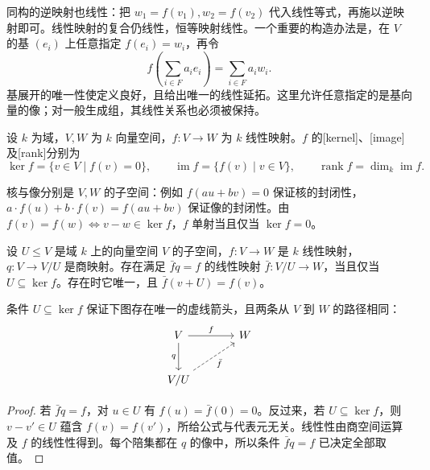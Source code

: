 同构的逆映射也线性：把 \(w_1=f(v_1),w_2=f(v_2)\) 代入线性等式，再施以逆映射即可。线性映射的复合仍线性，恒等映射线性。一个重要的构造办法是，在 \(V\) 的基 \((e_i)\) 上任意指定 \(f(e_i)=w_i\)，再令
\[
	f\left(\sum_{i\in F}a_ie_i\right)=\sum_{i\in F}a_iw_i.
\]
基展开的唯一性使定义良好，且给出唯一的线性延拓。这里允许任意指定的是基向量的像；对一般生成组，其线性关系也必须被保持。

\begin{definition}\label{b2:def:kernel-image-rank}
	设 \(k\) 为域，\(V,W\) 为 \(k\) 向量空间，\(f:V\to W\) 为 \(k\) 线性映射。\(f\) 的[kernel]、[image]及[rank]分别为
	\[
		\ker f=\{v\in V\mid f(v)=0\},\qquad \operatorname{im}f=\{f(v)\mid v\in V\},\qquad \operatorname{rank}f=\dim_k\operatorname{im}f.
	\]
\end{definition}

核与像分别是 \(V,W\) 的子空间：例如 \(f(au+bv)=0\) 保证核的封闭性，\(a\cdot f(u)+b\cdot f(v)=f(au+bv)\) 保证像的封闭性。由 \(f(v)=f(w)\iff v-w\in\ker f\)，\(f\) 单射当且仅当 \(\ker f=0\)。

\begin{proposition}[商空间的映射性质]\label{b2:prop:quotient-linear-universal}
	设 \(U\le V\) 是域 \(k\) 上的向量空间 \(V\) 的子空间，\(f:V\to W\) 是 \(k\) 线性映射，\(q:V\to V/U\) 是商映射。存在满足 \(\bar f q=f\) 的线性映射 \(\bar f:V/U\to W\)，当且仅当 \(U\subseteq\ker f\)。存在时它唯一，且 \(\bar f(v+U)=f(v)\)。

	条件 \(U\subseteq\ker f\) 保证下图存在唯一的虚线箭头，且两条从 \(V\) 到 \(W\) 的路径相同：
	\[
		\begin{tikzcd}[column sep=3.5em,row sep=2.5em]
			V\arrow[r,"f"]\arrow[d,"q"']&W\\
			V/U\arrow[ur,dashed,"\bar f"']&
		\end{tikzcd}
	\]
\end{proposition}
\begin{proof}
	若 \(\bar f q=f\)，对 \(u\in U\) 有 \(f(u)=\bar f(0)=0\)。反过来，若 \(U\subseteq\ker f\)，则 \(v-v'\in U\) 蕴含 \(f(v)=f(v')\)，所给公式与代表元无关。线性性由商空间运算及 \(f\) 的线性性得到。每个陪集都在 \(q\) 的像中，所以条件 \(\bar f q=f\) 已决定全部取值。
\end{proof}


